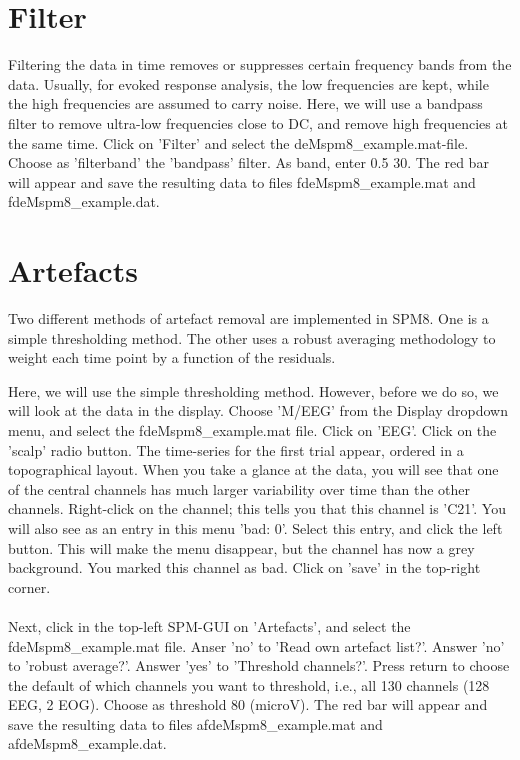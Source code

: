 \section{Filter}
Filtering the data in time removes or suppresses certain frequency bands from the data. Usually, for evoked response analysis, the low frequencies are kept, while the high frequencies are assumed to carry noise. Here, we will use a bandpass filter to remove ultra-low frequencies close to DC, and remove high frequencies at the same time. Click on 'Filter' and select the deMspm8\_example.mat-file. Choose as 'filterband' the 'bandpass' filter. As band, enter 0.5 30. The red bar will appear and save the resulting data to files fdeMspm8\_example.mat and fdeMspm8\_example.dat.

\section{Artefacts}
Two different methods of artefact removal are implemented in SPM8. One
is a simple thresholding method. The other uses a robust averaging
methodology to weight each time point by a function of the residuals. 

Here, we will use the simple thresholding method. However, before we do so, we will look at the data in the display. Choose 'M/EEG' from the Display dropdown menu, and select the fdeMspm8\_example.mat file. Click on 'EEG'. Click on the 'scalp' radio button. The time-series for the first trial appear, ordered in a topographical layout. When you take a glance at the data, you will see that one of the central channels has much larger variability over time than the other channels. Right-click on the channel; this tells you that this channel is 'C21'. You will also see as an entry in this menu 'bad: 0'. Select this entry, and click the left button. This will make the menu disappear, but the channel has now a grey background. You marked this channel as bad. Click on 'save' in the top-right corner. 
\\
\\
Next, click in the top-left SPM-GUI on 'Artefacts', and select the fdeMspm8\_example.mat file. Anser 'no' to 'Read own artefact list?'. Answer 'no' to 'robust average?'. Answer 'yes' to 'Threshold channels?'. Press return to choose the default of which channels you want to threshold, i.e., all 130 channels (128 EEG, 2 EOG). Choose as threshold 80 (microV). The red bar will appear and save the resulting data to files afdeMspm8\_example.mat and afdeMspm8\_example.dat.

